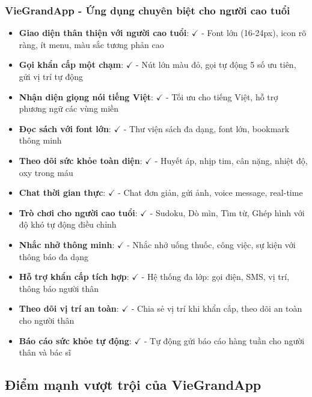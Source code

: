\documentclass[12pt,a4paper]{article}
\begin{document}
\subsubsection{VieGrandApp - Ứng dụng chuyên biệt cho người cao tuổi}
\begin{itemize}[leftmargin=2cm]
    \item \textbf{Giao diện thân thiện với người cao tuổi}: $\checkmark$ - Font lớn (16-24px), icon rõ ràng, ít menu, màu sắc tương phản cao
    \item \textbf{Gọi khẩn cấp một chạm}: $\checkmark$ - Nút lớn màu đỏ, gọi tự động 5 số ưu tiên, gửi vị trí tự động
    \item \textbf{Nhận diện giọng nói tiếng Việt}: $\checkmark$ - Tối ưu cho tiếng Việt, hỗ trợ phương ngữ các vùng miền
    \item \textbf{Đọc sách với font lớn}: $\checkmark$ - Thư viện sách đa dạng, font lớn, bookmark thông minh
    \item \textbf{Theo dõi sức khỏe toàn diện}: $\checkmark$ - Huyết áp, nhịp tim, cân nặng, nhiệt độ, oxy trong máu
    \item \textbf{Chat thời gian thực}: $\checkmark$ - Chat đơn giản, gửi ảnh, voice message, real-time
    \item \textbf{Trò chơi cho người cao tuổi}: $\checkmark$ - Sudoku, Dò mìn, Tìm từ, Ghép hình với độ khó tự động điều chỉnh
    \item \textbf{Nhắc nhở thông minh}: $\checkmark$ - Nhắc nhở uống thuốc, công việc, sự kiện với thông báo đa dạng

    \item \textbf{Hỗ trợ khẩn cấp tích hợp}: $\checkmark$ - Hệ thống đa lớp: gọi điện, SMS, vị trí, thông báo người thân
    \item \textbf{Theo dõi vị trí an toàn}: $\checkmark$ - Chia sẻ vị trí khi khẩn cấp, theo dõi an toàn cho người thân
    \item \textbf{Báo cáo sức khỏe tự động}: $\checkmark$ - Tự động gửi báo cáo hàng tuần cho người thân và bác sĩ
\end{itemize}

\subsection{Điểm mạnh vượt trội của VieGrandApp}
\end{document}
